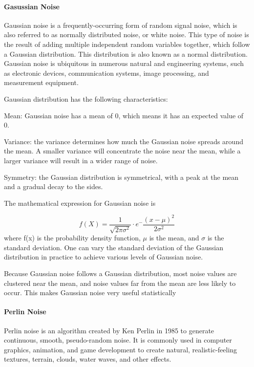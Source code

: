 \documentclass[runningheads,a4paper]{llncs}
\begin{document}
\paragraph{Gasussian Noise}
Gaussian noise is a frequently-occurring form of random signal noise, which is also referred to as normally distributed noise, or white noise\cite{jain1989fundamentals}. This type of noise is the result of adding multiple independent random variables together, which follow a Gaussian distribution. This distribution is also known as a normal distribution. Gaussian noise is ubiquitous in numerous natural and engineering systems, such as electronic devices, communication systems, image processing, and measurement equipment.

Gaussian distribution has the following characteristics:

Mean: Gaussian noise has a mean of 0, which means it has an expected value of 0.

Variance: the variance determines how much the Gaussian noise spreads around the mean. 
A smaller variance will concentrate the noise near the mean, while a larger variance will result in a wider range of noise.

Symmetry: the Gaussian distribution is symmetrical, with a peak at the mean and a gradual decay to the sides.

The mathematical expression for Gaussian noise is

\begin{equation}
f(X) = \frac{1}{\sqrt{2\pi\sigma^2}}\cdot e^-\frac{(x-\mu)^2}{2\sigma^2}
\end{equation}
where f(x) is the probability density function, $\mu$ is the mean, and $\sigma$ is the standard deviation.
One can vary the standard deviation of the Gaussian distribution in practice to achieve various levels of Gaussian noise.

Because Gaussian noise follows a Gaussian distribution, most noise values are clustered near the mean, and noise values far from the mean are less likely to occur. This makes Gaussian noise very useful statistically

\paragraph{Perlin Noise}
Perlin noise is an algorithm created by Ken Perlin in 1985 to generate continuous, smooth, pseudo-random noise\cite{perlin1985image}. It is commonly used in computer graphics, animation, and game development to create natural, realistic-feeling textures, terrain, clouds, water waves, and other effects\cite{green2005implementing}.
\end{document}
